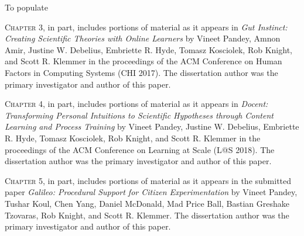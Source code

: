 \begin{frontmatter}
\begin{acknowledgements}
To populate

\vspace{0.25in}

\textsc{Chapter 3}, in part, includes portions of material as it appears in \emph{Gut Instinct: Creating Scientific Theories with Online Learners} by Vineet Pandey, Amnon Amir, Justine W. Debelius, Embriette R. Hyde, Tomasz Kosciolek, Rob Knight, and Scott R. Klemmer in the proceedings of the ACM Conference on Human Factors in Computing Systems (CHI 2017). The dissertation author was the primary investigator and author of this paper.

\textsc{Chapter 4}, in part, includes portions of material as it appears in \emph{Docent: Transforming Personal Intuitions to Scientific Hypotheses through Content Learning and Process Training} by Vineet Pandey, Justine W. Debelius, Embriette R. Hyde, Tomasz Kosciolek, Rob Knight, and Scott R. Klemmer in the proceedings of the ACM Conference on Learning at Scale (L@S 2018). The dissertation author was the primary investigator and author of this paper.

\textsc{Chapter 5}, in part, includes portions of material as it appears in  the submitted paper \emph{Galileo: Procedural Support for Citizen Experimentation} by Vineet Pandey, Tushar Koul, Chen Yang, Daniel McDonald, Mad Price Ball, Bastian Greshake Tzovaras, Rob Knight, and Scott R. Klemmer. The dissertation author was the primary investigator and author of this paper.

\end{acknowledgements}


\end{frontmatter}

